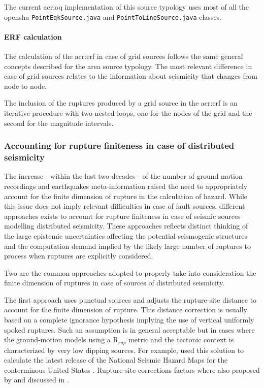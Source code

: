 {%
The current \gls{acr:oq} implementation of this source typology 
uses most of all the \gls{opensha} \texttt{PointEqkSource.java}
and \texttt{PointToLineSource.java} classes.
%
\paragraph{ERF calculation}
The calculation of the \gls{acr:erf} in case of grid sources follows 
the same general concepts described for the area source typology.
The most relevant difference in case of grid sources relates to the 
information about seismicity that changes from node to node.

The inclusion of the ruptures produced by a grid source in the 
\gls{acr:erf} is an iterative procedure with two nested loops, one 
for the nodes of the grid and the second for the magnitude intervals. 
%
\subsubsection{Accounting for rupture finiteness in case of distributed 
seismicity}
% 
The increase - within the last two decades - of the number of 
ground-motion recordings and earthquakes meta-information raised 
the need to appropriately account for the finite dimension of rupture 
in the calculation of hazard.
% 
While this issue does not imply relevant difficulties in case of 
fault sources, different approaches exists to account for rupture 
finiteness in case of seismic sources modelling distributed 
seismicity. 
% 
These approaches reflects distinct thinking of the 
large epistemic uncertainties affecting the potential seismogenic 
structures and the computation demand implied by the likely 
large number of ruptures to process when ruptures are explicitly
considered.

Two are the common approaches adopted to properly take into 
consideration the finite dimension of ruptures in case of sources 
of distributed seismicity.

The first approach uses punctual sources and adjusts the 
rupture-site distance to account for the finite dimension of rupture.
%
This distance correction is usually based on a complete ignorance 
hypothesis implying the use of vertical uniformly spoked ruptures.
%
Such an assumption is in general acceptable but in cases where the 
ground-motion models using a R$_{rup}$ metric and the tectonic context
is characterized by very low dipping sources.
%
For example, \citet{petersen2008} used this solution to calculate
the latest release of the National Seismic Hazard Maps for the 
conterminous United States \citep[see also][]{harmsen2008}. 
%
Rupture-site corrections factors where also proposed by 
\citet{scherbaum2004} and discussed in \citet{beyer2006}.

}
